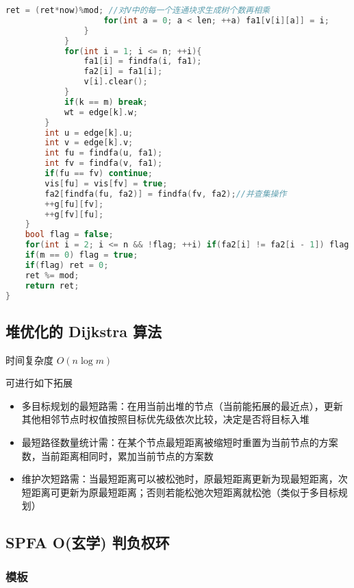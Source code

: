 \begin{lstlisting}[language=C++]
                    ret = (ret*now)%mod; //对V中的每一个连通块求生成树个数再相乘
                    for(int a = 0; a < len; ++a) fa1[v[i][a]] = i;
                }
            }
            for(int i = 1; i <= n; ++i){
                fa1[i] = findfa(i, fa1);
                fa2[i] = fa1[i];
                v[i].clear();
            }
            if(k == m) break;
            wt = edge[k].w;
        }
        int u = edge[k].u;
        int v = edge[k].v;
        int fu = findfa(u, fa1);
        int fv = findfa(v, fa1);
        if(fu == fv) continue;
        vis[fu] = vis[fv] = true;
        fa2[findfa(fu, fa2)] = findfa(fv, fa2);//并查集操作
        ++g[fu][fv];
        ++g[fv][fu];
    }
    bool flag = false;
    for(int i = 2; i <= n && !flag; ++i) if(fa2[i] != fa2[i - 1]) flag = true;
    if(m == 0) flag = true;
    if(flag) ret = 0;
    ret %= mod;
    return ret;
}
\end{lstlisting}

\subsection{堆优化的 Dijkstra 算法}

时间复杂度 $O(n \log m)$

可进行如下拓展

\begin{itemize}
    \item 多目标规划的最短路需：在用当前出堆的节点（当前能拓展的最近点），更新其他相邻节点时权值按照目标优先级依次比较，决定是否将目标入堆
    \item 最短路径数量统计需：在某个节点最短距离被缩短时重置为当前节点的方案数，当前距离相同时，累加当前节点的方案数
    \item 维护次短路需：当最短距离可以被松弛时，原最短距离更新为现最短距离，次短距离可更新为原最短距离；否则若能松弛次短距离就松弛（类似于多目标规划）
\end{itemize}

\subsection{SPFA O(玄学) 判负权环}

\subsubsection{模板}

